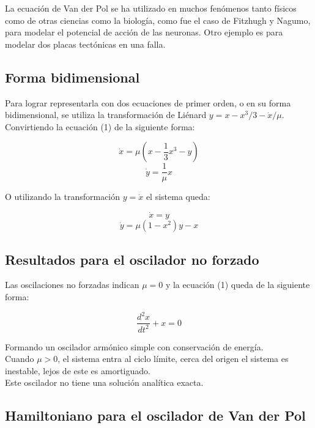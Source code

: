 \documentclass[12pt]{article}
\begin{document}
La ecuación de Van der Pol se ha utilizado en muchos fenómenos tanto físicos como de otras ciencias como la biología, como fue el caso de Fitzhugh y Nagumo, para modelar el potencial de acción de las neuronas. Otro ejemplo es para modelar dos placas tectónicas en una falla. 

\subsection{Forma bidimensional}

Para lograr representarla con dos ecuaciones de primer orden, o en su forma bidimensional, se utiliza la transformación de Liénard $y=x-x^3/3 -\dot{x}/\mu$. Convirtiendo la ecuación (1) de la siguiente forma:

\begin{equation}
\dot{x}=\mu (x-\frac{1}{3}x^3 -y)
\end{equation}
\begin{equation}
\dot{y}=\frac{1}{\mu}x
\end{equation}

O utilizando la transformación $y=\dot{x}$ el sistema queda:

\begin{equation}
\dot{x}=y
\end{equation}
\begin{equation}
\dot{y}=\mu(1-x^2)y-x
\end{equation}

\subsection{Resultados para el oscilador no forzado}

Las oscilaciones no forzadas indican $\mu=0$ y la ecuación (1) queda de la siguiente forma:

\begin{equation}
\frac{d^2x}{dt^2}+x=0
\end{equation}

Formando un oscilador armónico simple con conservación de energía.\\

Cuando $\mu >0$, el sistema entra al ciclo límite, cerca del origen el sistema es inestable, lejos de este es amortiguado.\\

Este oscilador no tiene una solución analítica exacta.

\subsection{Hamiltoniano para el oscilador de Van der Pol}
\end{document}
